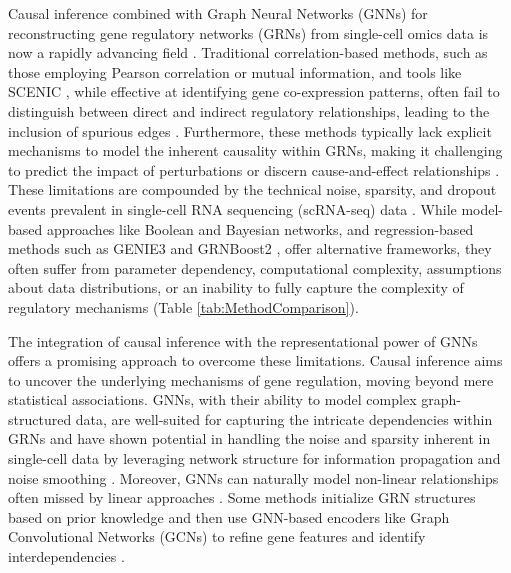 

Causal inference combined with Graph Neural Networks (GNNs) for reconstructing gene regulatory networks (GRNs) from single-cell omics data is now a rapidly advancing field \cite{zevcevic2021relating,chen2022graph}. Traditional correlation-based methods, such as those employing Pearson correlation or mutual information, and tools like SCENIC \cite{aibar2017scenic,bravo2023scenic}, while effective at identifying gene co-expression patterns, often fail to distinguish between direct and indirect regulatory relationships, leading to the inclusion of spurious edges \cite{badia2023gene,shu2021modeling,li2023single}. Furthermore, these methods typically lack explicit mechanisms to model the inherent causality within GRNs, making it challenging to predict the impact of perturbations or discern cause-and-effect relationships \cite{shu2021modeling}. These limitations are compounded by the technical noise, sparsity, and dropout events prevalent in single-cell RNA sequencing (scRNA-seq) data \cite{lei2024deepgrncs,dai2024gene,mao2023predicting}. While model-based approaches like Boolean and Bayesian networks, and regression-based methods such as GENIE3 \cite{huynh2010inferring} and GRNBoost2 \cite{moerman2019grnboost2}, offer alternative frameworks, they often suffer from parameter dependency, computational complexity, assumptions about data distributions, or an inability to fully capture the complexity of regulatory mechanisms \cite{lei2024deepgrncs,badia2023gene} (Table \ref{tab:MethodComparison}).

The integration of causal inference \cite{pearl2009causal} with the representational power of GNNs \cite{wein2021graph} offers a promising approach to overcome these limitations. Causal inference aims to uncover the underlying mechanisms of gene regulation, moving beyond mere statistical associations. GNNs, with their ability to model complex graph-structured data, are well-suited for capturing the intricate dependencies within GRNs and have shown potential in handling the noise and sparsity inherent in single-cell data by leveraging network structure for information propagation and noise smoothing \cite{zhao2022hybrid,wang2021scgnn,gu2022scgnn}. Moreover, GNNs can naturally model non-linear relationships often missed by linear approaches \cite{mercatelli2020gene,otal2024analysis,feng2023gene}. Some methods initialize GRN structures based on prior knowledge and then use GNN-based encoders like Graph Convolutional Networks (GCNs) to refine gene features and identify interdependencies \cite{mao2023predicting,mao2023gene,zhao2021comprehensive,keyl2023single,cao2022multi}.


